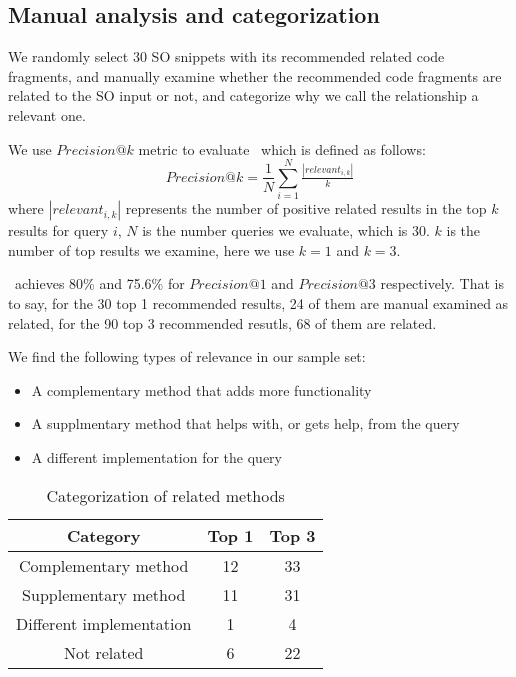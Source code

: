 \subsection{Manual analysis and categorization}
We randomly select 30 SO snippets with its recommended related code fragments, and manually examine whether the recommended code fragments are related to the SO input or not, and categorize why we call the relationship a relevant one.

We use $Precision@k$ metric to evaluate \tool\  which is defined as follows:
\begin{equation}
Precision@k = \frac{1}{N}\sum_{i=1}^{N}\tfrac{\left | relevant_{i,k} \right |}{k}
\end{equation}
where $\left | relevant_{i,k} \right |$ represents the number of positive related results in the top $k$ results for query $i$, $N$ is the number queries we evaluate, which is $30$. $k$ is the number of top results we examine, here we use $k=1$ and $k=3$.

\tool\ achieves 80\% and 75.6\% for $Precision@1$ and $Precision@3$ respectively. That is to say, for the 30 top 1 recommended results, 24 of them are manual examined as related, for the 90 top 3 recommended resutls, 68 of them are related.

We find the following types of relevance in our sample set:
\begin{itemize}
	\item A complementary method that adds more functionality
	\item A supplmentary method that helps with, or gets help, from the query 
	\item A different implementation for the query	
\end{itemize}

\begin{table}
	\begin{center}
		\begin{tabular}{ c|c|c } 
			Category & Top 1 & Top 3 \\\hline
			Complementary method &  12 & 33\\\hline 
			Supplementary method &  11 & 31 \\ \hline
			Different implementation &  1 & 4 \\ \hline
			Not related & 6 & 22
		\end{tabular}		
	\end{center}
	\caption{Categorization of related methods}
	\label{tab:categorization}
\end{table}
	
